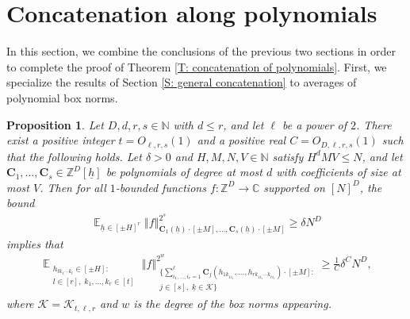 \documentclass[11pt]{amsart}
\newtheorem{proposition}[lemma]{Proposition}
\theoremstyle{definition}
\DeclareMathOperator*{\E}{\mathbb{E}}
\newcommand{\C}{{\mathbb C}}
\newcommand{\N}{{\mathbb N}}
\newcommand{\Z}{{\mathbb Z}}
\newcommand{\CK}{{\mathcal K}}
\newcommand{\bc}{{\mathbf{C}}}
\newcommand{\uh}{{\underline{h}}}
\newcommand{\uk}{{\underline{k}}}
\newcommand{\norm}[1]{\left\Vert #1\right\Vert}
\begin{document}
\section{Concatenation along polynomials}\label{S: concatenation along polys}
In this section, we combine the conclusions of the previous two sections in order to complete the proof of Theorem \ref{T: concatenation of polynomials}. First, we specialize the results of Section \ref{S: general concatenation} to averages of polynomial box norms.
\begin{proposition}\label{P: concatenation of polynomials I}
    Let $D,d, r, s\in\N$ with $d\leq r$, and let $\ell$ be a power of $2$. There exist a positive integer $t=O_{\ell, r, s}(1)$ and a positive real $C=O_{D,\ell,r,s}(1)$ such that the following holds.  Let $\delta>0$ and $H, M, N, V\in\N$ satisfy $H^d M V \leq N$, and let $\bc_1, \ldots, \bc_s\in\Z^D[\uh]$ be polynomials of degree at most $d$ with coefficients of size at most $V$.  Then for all $1$-bounded functions $f:\Z^D\to\C$ supported on $[N]^D$, the bound
    \begin{align}
        \E_{\uh\in[\pm H]^r}\norm{f}_{\bc_1(\uh)\cdot[\pm M], \ldots, \bc_s(\uh)\cdot[\pm M]}^{2^s}\geq \delta N^D
    \end{align}
    implies that
        \begin{align*}
        \E_{\substack{h_{lk_1\cdots k_l}\in[\pm H]:\\ l\in[r],\; k_1, \ldots, k_r\in[t]}}
        \norm{f}_{\substack{\{\sum_{i_1, \ldots, i_r=1}^{\ell}\bc_j(h_{1k_{1i_1}}, \ldots, h_{rk_{1i_1}\cdots k_{ri_r}})\cdot[\pm M]:\\ j\in[s],\; \uk \in \CK
 \}}}^{2^{w}} \geq \frac{1}{C}\delta^{C} N^D,
    \end{align*}
    where $\CK=\CK_{t,\ell,r}$ and $w$ is the degree of the box norms appearing.
\end{proposition}
\end{document}
